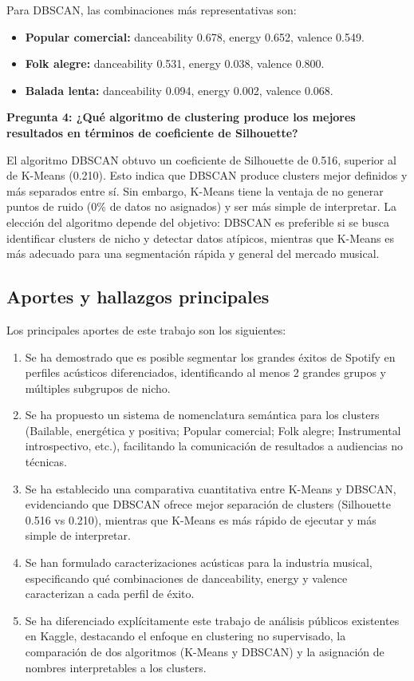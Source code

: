 Para DBSCAN, las combinaciones más representativas son:

\begin{itemize}
    \item \textbf{Popular comercial:} danceability 0.678, energy 0.652, valence 0.549.
    \item \textbf{Folk alegre:} danceability 0.531, energy 0.038, valence 0.800.
    \item \textbf{Balada lenta:} danceability 0.094, energy 0.002, valence 0.068.
\end{itemize}

\textbf{Pregunta 4: ¿Qué algoritmo de clustering produce los mejores resultados en términos de coeficiente de Silhouette?}

El algoritmo DBSCAN obtuvo un coeficiente de Silhouette de 0.516, superior al de K-Means (0.210). Esto indica que DBSCAN produce clusters mejor definidos y más separados entre sí. Sin embargo, K-Means tiene la ventaja de no generar puntos de ruido (0\% de datos no asignados) y ser más simple de interpretar. La elección del algoritmo depende del objetivo: DBSCAN es preferible si se busca identificar clusters de nicho y detectar datos atípicos, mientras que K-Means es más adecuado para una segmentación rápida y general del mercado musical.

\subsection{Aportes y hallazgos principales}

Los principales aportes de este trabajo son los siguientes:

\begin{enumerate}
    \item Se ha demostrado que es posible segmentar los grandes éxitos de Spotify en perfiles acústicos diferenciados, identificando al menos 2 grandes grupos y múltiples subgrupos de nicho.
    
    \item Se ha propuesto un sistema de nomenclatura semántica para los clusters (Bailable, energética y positiva; Popular comercial; Folk alegre; Instrumental introspectivo, etc.), facilitando la comunicación de resultados a audiencias no técnicas.
    
    \item Se ha establecido una comparativa cuantitativa entre K-Means y DBSCAN, evidenciando que DBSCAN ofrece mejor separación de clusters (Silhouette 0.516 vs 0.210), mientras que K-Means es más rápido de ejecutar y más simple de interpretar.
    
    \item Se han formulado caracterizaciones acústicas para la industria musical, especificando qué combinaciones de danceability, energy y valence caracterizan a cada perfil de éxito.
    
    \item Se ha diferenciado explícitamente este trabajo de análisis públicos existentes en Kaggle, destacando el enfoque en clustering no supervisado, la comparación de dos algoritmos (K-Means y DBSCAN) y la asignación de nombres interpretables a los clusters.
\end{enumerate}

